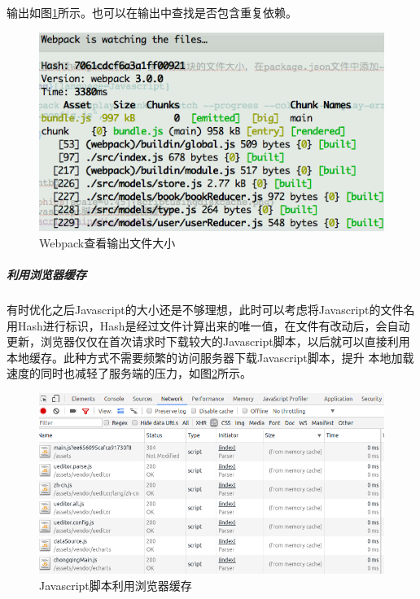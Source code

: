 \documentclass[12pt]{book}
\numberwithin{dummy}{section}
\theoremstyle{ocrenumbox}
\theoremstyle{blacknumex}
\theoremstyle{blacknumbox}
\theoremstyle{ocrenum}
\begin{document}
输出如图\ref{fig:webpackcheckingfilesize}所示。也可以在输出中查找是否包含重复依赖。

\begin{figure}[htbp]
	\centering
	\includegraphics[scale=0.7]{webpackcheckingfilesize.png}
	\caption{Webpack查看输出文件大小}
	\label{fig:webpackcheckingfilesize}
\end{figure}


\subparagraph{利用浏览器缓存}

有时优化之后Javascript的大小还是不够理想，此时可以考虑将Javascript的文件名用Hash进行标识，Hash是经过文件计算出来的唯一值，在文件有改动后，会自动更新，浏览器仅仅在首次请求时下载较大的Javascript脚本，以后就可以直接利用本地缓存。此种方式不需要频繁的访问服务器下载Javascript脚本，提升 本地加载速度的同时也减轻了服务端的压力，如图\ref{fig:scriptusingdiskcache}所示。

\begin{figure}[htbp]
	\centering
	\includegraphics[scale=0.45]{scriptusingdiskcache.png}
	\caption{Javascript脚本利用浏览器缓存}
	\label{fig:scriptusingdiskcache}
\end{figure}
\end{document}
